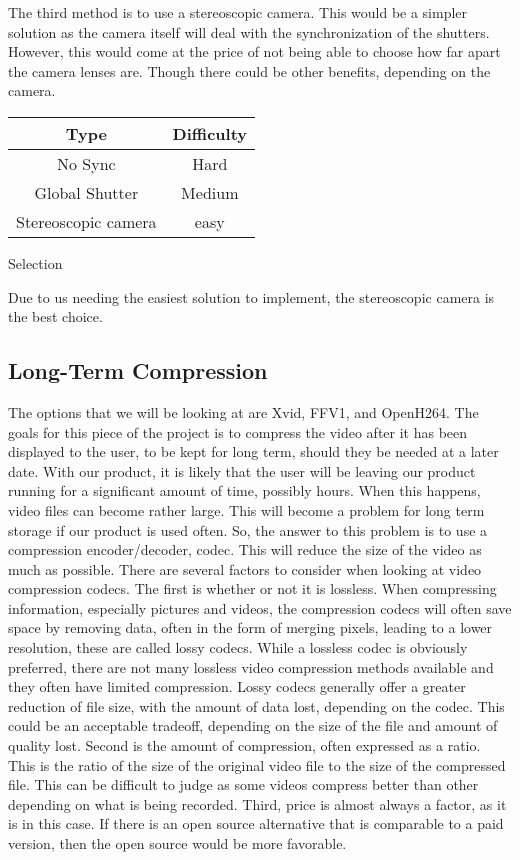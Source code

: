 \documentclass[letterpaper,10pt,onecolumn,draftclsnofoot]{IEEEtran}
\begin{document}
The third method is to use a stereoscopic camera.
This would be a simpler solution as the camera itself will deal with the synchronization of the shutters.
However, this would come at the price of not being able to choose how far apart the camera lenses are.
Though there could be other benefits, depending on the camera.

\begin{center}
	\begin{tabular}{|c|c|}
		\hline
		\textbf{Type} & \textbf{Difficulty} \\
		\hline
		No Sync & Hard \\
		\hline
		Global Shutter & Medium\\
		\hline
		Stereoscopic camera & easy \\
		\hline
		
	\end{tabular}
\end{center}


Selection

Due to us needing the easiest solution to implement, the stereoscopic camera is the best choice.


\newpage
\subsection{Long-Term Compression} %

The options that we will be looking at are Xvid, FFV1, and OpenH264.
The goals for this piece of the project is to compress the video after it has been displayed to the user, to be kept for long term, should they be needed at a later date.
With our product, it is likely that the user will be leaving our product running for a significant amount of time, possibly hours.
When this happens, video files can become rather large.
This will become a problem for long term storage if our product is used often.
So, the answer to this problem is to use a compression encoder/decoder, codec.
This will reduce the size of the video as much as possible.
There are several factors to consider when looking at video compression codecs.
The first is whether or not it is lossless.
When compressing information, especially pictures and videos, the compression codecs will often save space by removing data, often in the form of merging pixels, leading to a lower resolution, these are called lossy codecs.
While a lossless codec is obviously preferred, there are not many lossless video compression methods available and they often have limited compression.
Lossy codecs generally offer a greater reduction of file size, with the amount of data lost, depending on the codec.
This could be an acceptable tradeoff, depending on the size of the file and amount of quality lost.
Second is the amount of compression, often expressed as a ratio.
This is the ratio of the size of the original video file to the size of the compressed file.
This can be difficult to judge as some videos compress better than other depending on what is being recorded.
Third, price is almost always a factor, as it is in this case.
If there is an open source alternative that is comparable to a paid version, then the open source would be more favorable.
\end{document}
